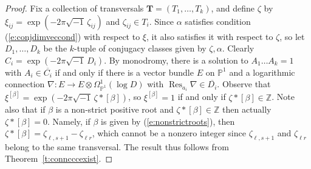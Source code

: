 \documentclass{amsart}
\theoremstyle{plain}
\theoremstyle{definition}
\theoremstyle{remark}
\newcommand{\Z}{\mathbb{Z}}
\newcommand{\PP}{\mathbb{P}}
\DeclareMathOperator{\Res}{Res}
\begin{document}
\begin{proof}
Fix a collection of transversals $\mathbf{T}=(T_1,\dots,T_k)$, and define
$\zeta$ by $\xi_{ij}=\exp(-2\pi\sqrt{-1} \, \zeta_{ij})$ and $\zeta_{ij}\in T_i$.
Since $\alpha$ satisfies condition (\ref{e:conjdimveccond}) with respect
to $\xi$, it also satisfies it with respect to $\zeta$, so let
$D_1,\dots,D_k$ be the $k$-tuple of conjugacy classes given by $\zeta,\alpha$.
Clearly $C_i = \exp(-2\pi\sqrt{-1} \, D_i)$.
By monodromy, there is a solution to $A_1\dots A_k = 1$
with $A_i\in\overline{C_i}$ if and only if there is a vector bundle $E$ on $\PP^1$ and a logarithmic
connection $\nabla:E\to E\otimes \Omega^1_{\PP^1}(\log D)$ with $\Res_{a_i}\nabla \in\overline{D_i}$.
Observe that $\xi^{[\beta]}= \exp(-2\pi \sqrt{-1} \, \zeta*[\beta])$,
so $\xi^{[\beta]}=1$ if and only if $\zeta*[\beta]\in\Z$.
Note also that if $\beta$ is a non-strict positive root
and $\zeta*[\beta]\in\Z$ then actually $\zeta*[\beta]=0$.
Namely, if $\beta$ is given by (\ref{e:nonstrictroots}),
then $\zeta*[\beta] = \zeta_{\ell,s+1}-\zeta_{\ell r}$, which cannot
be a nonzero integer since $\zeta_{\ell,s+1}$ and $\zeta_{\ell r}$ belong
to the same transversal.
The result thus follows from Theorem~\ref{t:conncccexist}.
\end{proof}
\end{document}

